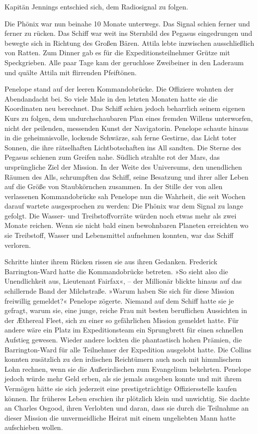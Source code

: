 Kapitän Jennings entschied sich, dem Radiosignal zu folgen.

\tb

Die Phönix war nun beinahe 10 Monate unterwegs. Das Signal schien
ferner und ferner zu rücken. Das Schiff war weit ins Sternbild des
Pegasus eingedrungen und bewegte sich in Richtung des Großen Bären.
Attila lebte inzwischen ausschließlich von Ratten. Zum Dinner gab
es für die Expeditionsteilnehmer Grütze mit Speckgrieben. Alle paar
Tage kam der geruchlose Zweibeiner in den Laderaum und quälte
Attila mit flirrenden Pfeiftönen.

\tb

Penelope stand auf der leeren Kommandobrücke. Die Offiziere wohnten
der Abendandacht bei. So viele Male in den letzten Monaten hatte
sie die Koordinaten neu berechnet. Das Schiff schien jedoch
beharrlich seinem eigenen Kurs zu folgen, dem undurchschaubaren
Plan eines fremden Willens unterworfen, nicht der peilenden,
messenden Kunst der Navigatorin. Penelope schaute hinaus in die
geheimnisvolle, lockende Schwärze, sah ferne Gestirne, das Licht
toter Sonnen, die ihre rätselhaften Lichtbotschaften ins All
sandten. Die Sterne des Pegasus schienen zum Greifen nahe. Südlich
strahlte rot der Mars, das ursprüngliche Ziel der Mission. In der
Weite des Universums, den unendlichen Räumen des Alls, schrumpften
das Schiff, seine Besatzung und ihrer aller Leben auf die Größe von
Staubkörnchen zusammen. In der Stille der von allen verlassenen
Kommandobrücke sah Penelope nun die Wahrheit, die seit Wochen
darauf wartete ausgesprochen zu werden: Die Phönix war dem Signal
zu lange gefolgt. Die Wasser- und Treibstoffvorräte würden noch
etwas mehr als zwei Monate reichen. Wenn sie nicht bald einen
bewohnbaren Planeten erreichten wo sie Treibstoff, Wasser und
Lebensmittel aufnehmen konnten, war das Schiff verloren.

\bigpar

Schritte hinter ihrem Rücken rissen sie aus ihren Gedanken.
Frederick Barrington-Ward hatte die Kommandobrücke betreten. »So
sieht also die Unendlichkeit aus, Lieutenant Fairfax«, – der
Millionär blickte hinaus auf das schillernde Band der Milchstraße.
»Warum haben Sie sich für diese Mission freiwillig gemeldet?«
Penelope zögerte. Niemand auf dem Schiff hatte sie je gefragt,
warum sie, eine junge, reiche Frau mit besten beruflichen
Aussichten in der Æthereal Fleet, sich zu einer so gefährlichen
Mission gemeldet hatte. Für andere wäre ein Platz im
Expeditionsteam ein Sprungbrett für einen schnellen Aufstieg
gewesen. Wieder andere lockten die phantastisch hohen Prämien, die
Barrington-Ward für alle Teilnehmer der Expedition ausgelobt hatte.
Die Collins konnten zusätzlich zu den irdischen Reichtümern auch
noch mit himmlischem Lohn rechnen, wenn sie die Außerirdischen zum
Evangelium bekehrten. Penelope jedoch würde mehr Geld erben, als
sie jemals ausgeben konnte und mit ihrem Vermögen hätte sie sich
jederzeit eine prestigeträchtige Offiziersstelle kaufen können. Ihr
früheres Leben erschien ihr plötzlich klein und unwichtig. Sie
dachte an Charles Osgood, ihren Verlobten und daran, dass sie durch
die Teilnahme an dieser Mission die unvermeidliche Heirat mit einem
ungeliebten Mann hatte aufschieben wollen.


